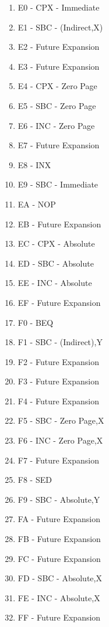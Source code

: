 \documentclass{article}
\begin{document}
\begin{multicols}{2}
\begin{enumerate}[label=\enumHex*,start=0]
    \item E0 - CPX - Immediate
    \item E1 - SBC - (Indirect,X)
    \item E2 - Future Expansion
    \item E3 - Future Expansion
    \item E4 - CPX - Zero Page
    \item E5 - SBC - Zero Page
    \item E6 - INC - Zero Page
    \item E7 - Future Expansion
    \item E8 - INX
    \item E9 - SBC - Immediate
    \item EA - NOP
    \item EB - Future Expansion
    \item EC - CPX - Absolute
    \item ED - SBC - Absolute
    \item EE - INC - Absolute
    \item EF - Future Expansion
    \item F0 - BEQ
    \item F1 - SBC - (Indirect),Y
    \item F2 - Future Expansion
    \item F3 - Future Expansion
    \item F4 - Future Expansion
    \item F5 - SBC - Zero Page,X
    \item F6 - INC - Zero Page,X
    \item F7 - Future Expansion
    \item F8 - SED
    \item F9 - SBC - Absolute,Y
    \item FA - Future Expansion
    \item FB - Future Expansion
    \item FC - Future Expansion
    \item FD - SBC - Absolute,X
    \item FE - INC - Absolute,X
    \item FF - Future Expansion
  \end{enumerate}
  \end{multicols}
\end{document}
